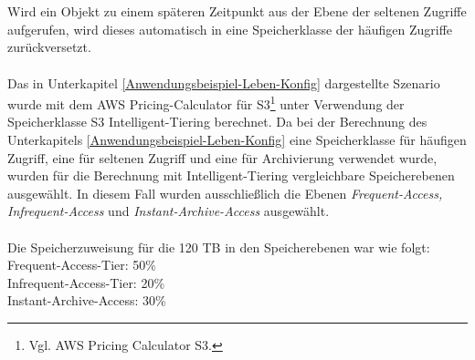 \\\\
Wird ein Objekt zu einem späteren Zeitpunkt aus der Ebene der seltenen Zugriffe aufgerufen, wird dieses automatisch in eine Speicherklasse der häufigen Zugriffe zurückversetzt.
\\\\
Das in Unterkapitel \ref{Anwendungsbeispiel-Leben-Konfig} dargestellte Szenario wurde mit dem AWS Pricing-Calculator für S3\footnote{Vgl.  AWS Pricing Calculator S3\cite{AMZ17-S3}.} unter Verwendung der Speicherklasse S3 Intelligent-Tiering berechnet. %
Da bei der Berechnung des Unterkapitels \ref{Anwendungsbeispiel-Leben-Konfig} eine Speicherklasse für häufigen Zugriff, eine für seltenen Zugriff und eine für Archivierung verwendet wurde, wurden für die Berechnung mit Intelligent-Tiering vergleichbare Speicherebenen ausgewählt. In diesem Fall wurden ausschließlich die Ebenen \textit{Frequent-Access, Infrequent-Access} und \textit{Instant-Archive-Access} ausgewählt. %
\\\\
Die Speicherzuweisung für die 120 TB in den Speicherebenen war wie folgt:\\
Frequent-Access-Tier: 50\% \\
Infrequent-Access-Tier: 20\%\\
Instant-Archive-Access: 30\%
\\
